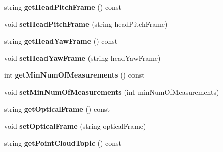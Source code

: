 \begin{DoxyCompactItemize}
\item 
\hypertarget{classDataCaptureParameter_a5a656f09e189765f4707f0291a04d107}{string {\bfseries get\-Head\-Pitch\-Frame} () const }\label{classDataCaptureParameter_a5a656f09e189765f4707f0291a04d107}

\item 
\hypertarget{classDataCaptureParameter_a01a144de3e8c49392a49ea0e4d846ba2}{void {\bfseries set\-Head\-Pitch\-Frame} (string head\-Pitch\-Frame)}\label{classDataCaptureParameter_a01a144de3e8c49392a49ea0e4d846ba2}

\item 
\hypertarget{classDataCaptureParameter_a8a1f406cb9c9bc3b097c648141a082cf}{string {\bfseries get\-Head\-Yaw\-Frame} () const }\label{classDataCaptureParameter_a8a1f406cb9c9bc3b097c648141a082cf}

\item 
\hypertarget{classDataCaptureParameter_a000c6bb2bba31a030425eed7c01f9751}{void {\bfseries set\-Head\-Yaw\-Frame} (string head\-Yaw\-Frame)}\label{classDataCaptureParameter_a000c6bb2bba31a030425eed7c01f9751}

\item 
\hypertarget{classDataCaptureParameter_aafba952669f9b6e29df5db6e20caab52}{int {\bfseries get\-Min\-Num\-Of\-Measurements} () const }\label{classDataCaptureParameter_aafba952669f9b6e29df5db6e20caab52}

\item 
\hypertarget{classDataCaptureParameter_a429177cbbff516470ded32526c90e9ed}{void {\bfseries set\-Min\-Num\-Of\-Measurements} (int min\-Num\-Of\-Measurements)}\label{classDataCaptureParameter_a429177cbbff516470ded32526c90e9ed}

\item 
\hypertarget{classDataCaptureParameter_a6c2c713fced1812014cfd99ec8713813}{string {\bfseries get\-Optical\-Frame} () const }\label{classDataCaptureParameter_a6c2c713fced1812014cfd99ec8713813}

\item 
\hypertarget{classDataCaptureParameter_a5e36293ddcd307146015f01d4800f8ce}{void {\bfseries set\-Optical\-Frame} (string optical\-Frame)}\label{classDataCaptureParameter_a5e36293ddcd307146015f01d4800f8ce}

\item 
\hypertarget{classDataCaptureParameter_a4f06c9d1aadc46c1200200ef7e278d54}{string {\bfseries get\-Point\-Cloud\-Topic} () const }\label{classDataCaptureParameter_a4f06c9d1aadc46c1200200ef7e278d54}


\end{DoxyCompactItemize}
